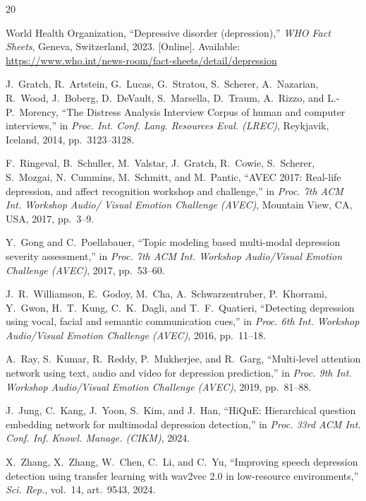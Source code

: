 \documentclass[journal]{IEEEtran}
\begin{document}
\begin{thebibliography}{20}

World Health Organization, ``Depressive disorder (depression),''
\textit{WHO Fact Sheets}, Geneva, Switzerland, 2023.
[Online]. Available: \url{https://www.who.int/news-room/fact-sheets/detail/depression}

J.~Gratch, R.~Artstein, G.~Lucas, G.~Stratou, S.~Scherer,
A.~Nazarian, R.~Wood, J.~Boberg, D.~DeVault, S.~Marsella,
D.~Traum, A.~Rizzo, and L.-P.~Morency,
``The Distress Analysis Interview Corpus of human and computer
interviews,'' in \textit{Proc. Int. Conf. Lang. Resources Eval.
(LREC)}, Reykjavik, Iceland, 2014, pp.~3123--3128.

F.~Ringeval, B.~Schuller, M.~Valstar, J.~Gratch, R.~Cowie,
S.~Scherer, S.~Mozgai, N.~Cummins, M.~Schmitt, and M.~Pantic,
``AVEC 2017: Real-life depression, and affect recognition workshop
and challenge,'' in \textit{Proc. 7th ACM Int. Workshop Audio/
Visual Emotion Challenge (AVEC)}, Mountain View, CA, USA, 2017,
pp.~3--9.

Y.~Gong and C.~Poellabauer,
``Topic modeling based multi-modal depression severity assessment,''
in \textit{Proc. 7th ACM Int. Workshop Audio/Visual Emotion
Challenge (AVEC)}, 2017, pp.~53--60.

J.~R.~Williamson, E.~Godoy, M.~Cha, A.~Schwarzentruber,
P.~Khorrami, Y.~Gwon, H.~T.~Kung, C.~K.~Dagli, and T.~F.~Quatieri,
``Detecting depression using vocal, facial and semantic
communication cues,'' in \textit{Proc. 6th Int. Workshop
Audio/Visual Emotion Challenge (AVEC)}, 2016, pp.~11--18.

A.~Ray, S.~Kumar, R.~Reddy, P.~Mukherjee, and R.~Garg,
``Multi-level attention network using text, audio and video
for depression prediction,'' in \textit{Proc. 9th Int. Workshop
Audio/Visual Emotion Challenge (AVEC)}, 2019, pp.~81--88.

J.~Jung, C.~Kang, J.~Yoon, S.~Kim, and J.~Han,
``HiQuE: Hierarchical question embedding network for multimodal
depression detection,'' in \textit{Proc. 33rd ACM Int. Conf. Inf.
Knowl. Manage. (CIKM)}, 2024.

X.~Zhang, X.~Zhang, W.~Chen, C.~Li, and C.~Yu,
``Improving speech depression detection using transfer learning with
wav2vec 2.0 in low-resource environments,''
\textit{Sci. Rep.}, vol.~14, art.~9543, 2024.


\end{thebibliography}
\end{document}
